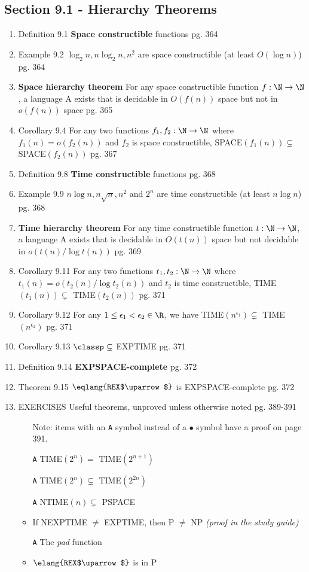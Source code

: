 \documentclass[12pt]{article} %
\newcommand{\theoremitem}[3]{\item #1 \quad #2 \dotfill #3}
\newenvironment{theoremlist} {
    \begin{enumerate}[nosep,leftmargin=*,label={}]
} {
    \end{enumerate}
}
\begin{document}
\subsection{Section 9.1 - Hierarchy Theorems}
\begin{theoremlist}
    \theoremitem{Definition 9.1}
    {\textbf{Space constructible} functions}
    {pg. 364}
    \theoremitem{Example 9.2}
    {$\log_2 n, n\log_2 n, n^2$ are space constructible (at least $O(\log n)$)}
    {pg. 364}
    \theoremitem{\textbf{Space hierarchy theorem}}
    {For any space constructible function $f:\N\rightarrow\N$, a language A exists that is decidable in $O(f(n))$ space but not in $o(f(n))$ space}
    {pg. 365}
    \theoremitem{Corollary 9.4}
    {For any two functions $f_1,f_2:\N\rightarrow\N$ where $f_1(n)=o(f_2(n))$ and $f_2$ is space constructible,
    SPACE$(f_1(n))\subsetneq$ SPACE$(f_2(n))$}
    {pg. 367}
    \theoremitem{Definition 9.8}
    {\textbf{Time constructible} functions}
    {pg. 368}
    \theoremitem{Example 9.9}
    {$n\log n, n\sqrt{n}, n^2$ and $2^n$ are time constructible (at least $n\log n$)}
    {pg. 368}
    \theoremitem{\textbf{Time hierarchy theorem}}
    {For any time constructible function $t:\N\rightarrow\N$, a language A exists that is decidable in $O(t(n))$ space but not decidable in $o(t(n)/\log t(n))$}
    {pg. 369}
    \theoremitem{Corollary 9.11}
    {For any two functions $t_1,t_2:\N\rightarrow\N$ where $t_1(n)=o(t_2(n)/\log t_2(n))$ and $t_2$ is time constructible,
    TIME$(t_1(n))\subsetneq$ TIME$(t_2(n))$}
    {pg. 371}
    \theoremitem{Corollary 9.12}
    {For any $1\leq\epsilon_1<\epsilon_2\in\R$, we have TIME$(n^{\epsilon_1})\subsetneq$ TIME$(n^{\epsilon_2})$}
    {pg. 371}
    \theoremitem{Corollary 9.13}
    {$\classp\subsetneq$ EXPTIME}
    {pg. 371}
    \theoremitem{Definition 9.14}
    {\textbf{EXPSPACE-complete}}
    {pg. 372}
    \theoremitem{Theorem 9.15}
    {$\eqlang{REX$\uparrow$}$ is EXPSPACE-complete}
    {pg. 372}

    \theoremitem{EXERCISES}
    {Useful theorems, unproved unless otherwise noted}
    {pg. 389-391}
    \begin{itemize}[nosep]
        \item[] Note: items with an \texttt{A} symbol instead of a $\bullet$ symbol have a proof on page 391.
        \item[\texttt{A}] TIME$(2^n)=$ TIME$(2^{n+1})$
        \item[\texttt{A}] TIME$(2^n)\subsetneq$ TIME$(2^{2n})$
        \item[\texttt{A}] NTIME$(n)\subsetneq$ PSPACE
        \item If NEXPTIME $\neq$ EXPTIME, then P $\neq$ NP \textit{(proof in the study guide)}
        \item[\texttt{A}] The \textit{pad} function
        \item $\elang{REX$\uparrow$}$ is in P  
    \end{itemize}
\end{theoremlist}
\end{document}
